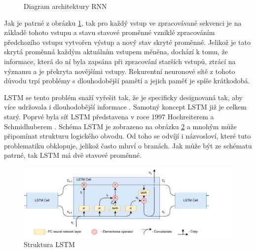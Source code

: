 \begin{figure}[h!]
	\centering
	\caption{Diagram architektury RNN}
	\label{fig:RNN_architecture}
\end{figure}

Jak je patrné z obrázku \ref{fig:RNN_architecture}, tak pro každý vstup ve zpracovávané sekvenci je na základě tohoto vstupu a stavu stavové proměnné vzniklé zpracováním předchozího vstupu vytvořen výstup a nový stav skryté proměnné.
Jelikož je tato skrytá proměnná každým aktuálním vstupem měněna, dochází k tomu, že informace, která do ní byla zapsána při zpracování starších vstupů, ztrácí na významu a je překryta novějšími vstupy.
Rekurentní neuronové sítě z tohoto důvodu trpí problémy s dlouhodobější pamětí a jejich paměť je spíše krátkodobá.

LSTM se tento problém snaží vyřešit tak, že je specificky designovaná tak, aby více udržovala i dlouhodobější informace \cite{understaning_lstm}.
Samotný koncept LSTM již je celkem starý.
Poprvé byla síť LSTM představena v roce 1997 Hochreiterem a Schmidhuberem \cite{LSTM}.
Schéma LSTM je zobrazeno na obrázku \ref{fig:LSTM_architecture} a mnohým může připomínat strukturu logického obvodu.
Od toho se odvíjí i názvosloví, které tuto problematiku obklopuje, jelikož často mluví o branách.
Jak může být ze schématu patrné, tak LSTM má dvě stavové proměnné.

\begin{figure}[h!]
	\centering
	\includegraphics[width=\textwidth]{Figures/solution/LSTM_diagram.pdf}
	\caption{Struktura LSTM}
	\label{fig:LSTM_architecture}
\end{figure}



